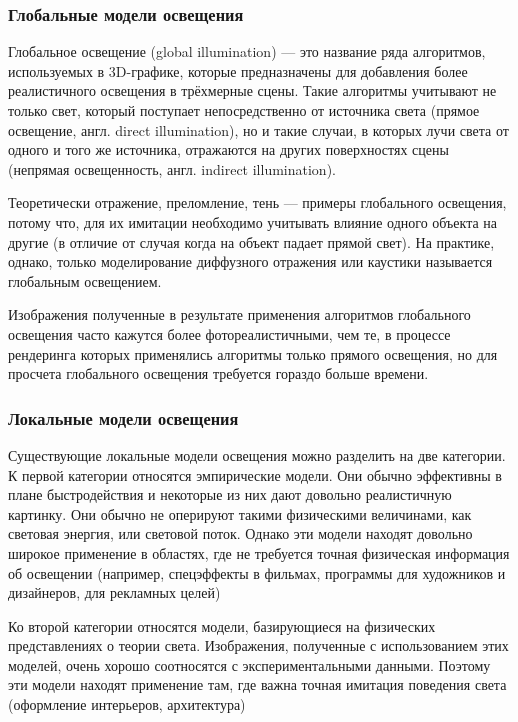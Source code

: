 \documentclass[12pt, a4paper]{article}
\begin{document}
\subsubsection{Глобальные модели освещения}

Глобальное освещение (global illumination) — это название ряда алгоритмов, используемых в 3D-графике, которые предназначены для добавления более реалистичного освещения в трёхмерные сцены. Такие алгоритмы учитывают не только свет, который поступает непосредственно от источника света (прямое освещение, англ. direct illumination), но и такие случаи, в которых лучи света от одного и того же источника, отражаются на других поверхностях сцены (непрямая освещенность, англ. indirect illumination).

Теоретически отражение, преломление, тень — примеры глобального освещения, потому что, для их имитации необходимо учитывать влияние одного объекта на другие (в отличие от случая когда на объект падает прямой свет). На практике, однако, только моделирование диффузного отражения или каустики называется глобальным освещением.

Изображения полученные в результате применения алгоритмов глобального освещения часто кажутся более фотореалистичными, чем те, в процессе рендеринга которых применялись алгоритмы только прямого освещения, но для просчета глобального освещения требуется гораздо больше времени.

\subsubsection{Локальные модели освещения}

Существующие локальные модели освещения можно разделить на две категории. К первой категории относятся эмпирические модели. Они обычно эффективны в плане быстродействия и некоторые из них дают довольно реалистичную картинку. Они обычно не оперируют такими физическими величинами, как световая энергия, или световой поток. Однако эти модели находят довольно широкое применение в областях, где не требуется точная физическая информация об освещении (например, спецэффекты в фильмах, программы для художников и дизайнеров, для рекламных целей)

Ко второй категории относятся модели, базирующиеся на физических представлениях о теории света. Изображения, полученные с использованием этих моделей, очень хорошо соотносятся с экспериментальными данными. Поэтому эти модели находят применение там, где важна точная имитация поведения света (оформление интерьеров, архитектура)
\end{document}

